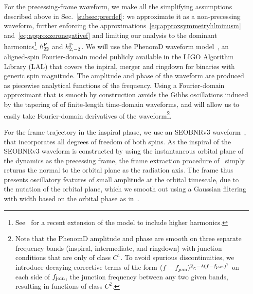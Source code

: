 \documentclass[aps,showpacs,twocolumn,
prd,superscriptaddress,nofootinbib]{revtex4-1}
\begin{document}
For the precessing-frame waveform, we make all the simplifying assumptions described above in Sec.~\ref{subsec:precdef}: we approximate it as a non-precessing waveform, further enforcing the approximations~\eqref{eq:approxsymmetryhlminusm} and~\eqref{eq:approxzeronegativef} and limiting our analysis to the dominant harmonics\footnote{See~\cite{London+17} for a recent extension of the model to include higher harmonics.} $h^{\rm P}_{22}$ and $h^{\rm P}_{2,-2}$. We will use the PhenomD waveform model~\cite{Husa+15, Khan+15}, an aligned-spin Fourier-domain model publicly available in the LIGO Algorithm Library (LAL) that covers the inpiral, merger and ringdown for binaries with generic spin magnitude. The amplitude and phase of the waveform are produced as piecewise analytical functions of the frequency. Using a Fourier-domain approximant that is smooth by construction avoids the Gibbs oscillations induced by the tapering of of finite-length time-domain waveforms, and will allow us to easily take Fourier-domain derivatives of the waveform\footnote{Note that the PhenomD amplitude and phase are smooth on three separate frequency bands (inspiral, intermediate, and ringdown) with junction conditions that are only of class $C^{1}$. To avoid spurious discontinuities, we introduce decaying corrective terms of the form $(f-f_{\rm join})^{2} e^{-\lambda(f-f_{\rm join})^{2}}$ on each side of $f_{\rm join}$, the junction frequency between any two given bands, resulting in functions of class $C^{2}$.}.

For the frame trajectory in the inspiral phase, we use an SEOBNRv3 waveform~\cite{Pan+13, BTB16}, that incorporates all degrees of freedom of both spins. As the inspiral of the SEOBNRv3 waveform is constructed by using the instantaneous orbital plane of the dynamics as the precessing frame, the frame extraction procedure of~\cite{OShaughnessy+11} simply returns the normal to the orbital plane as the radiation axis. The frame thus presents oscillatory features of small amplitude at the orbital timescale, due to the nutation of the orbital plane, which we smooth out using a Gaussian filtering with width based on the orbital phase as in~\cite{Blackman+17a}.
\end{document}

